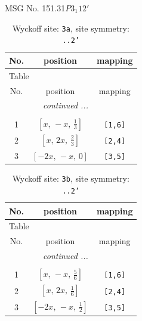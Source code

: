 \documentclass[fleqn,8pt]{jsarticle}
\begin{document}
\setcounter{MaxMatrixCols}{32}

\renewcommand{\tablename}{Table~}
\renewcommand{\figurename}{Figure~}
\begin{center}
\LARGE
MSG No. 151.31\quad$P3_{1}12'$
\end{center}
\renewcommand{\arraystretch}{1.2}
\begin{longtable}{ccc}
\caption{Wyckoff site: {\tt 3a}, site symmetry: {\tt ..2'}}
 \\
 \hline \hline
No. & position & mapping \\ \hline \endfirsthead

\multicolumn{2}{l}{\tablename\ \thetable{}} \\
 \hline \hline
No. & position & mapping \\ \hline \endhead

 \hline \hline
\multicolumn{2}{r}{\footnotesize\it continued ...} \\ \endfoot

 \hline \hline
\multicolumn{2}{r}{} \\ \endlastfoot

1 & $\left[ x,\, - x,\, \frac{1}{3} \right]$ & {\tt [1,6]} \\ \hline
2 & $\left[ x,\, 2 x,\, \frac{2}{3} \right]$ & {\tt [2,4]} \\ \hline
3 & $\left[ - 2 x,\, - x,\, 0 \right]$ & {\tt [3,5]} \\
\end{longtable}
\renewcommand{\arraystretch}{1.2}
\begin{longtable}{ccc}
\caption{Wyckoff site: {\tt 3b}, site symmetry: {\tt ..2'}}
 \\
 \hline \hline
No. & position & mapping \\ \hline \endfirsthead

\multicolumn{2}{l}{\tablename\ \thetable{}} \\
 \hline \hline
No. & position & mapping \\ \hline \endhead

 \hline \hline
\multicolumn{2}{r}{\footnotesize\it continued ...} \\ \endfoot

 \hline \hline
\multicolumn{2}{r}{} \\ \endlastfoot

1 & $\left[ x,\, - x,\, \frac{5}{6} \right]$ & {\tt [1,6]} \\ \hline
2 & $\left[ x,\, 2 x,\, \frac{1}{6} \right]$ & {\tt [2,4]} \\ \hline
3 & $\left[ - 2 x,\, - x,\, \frac{1}{2} \right]$ & {\tt [3,5]} \\
\end{longtable}
\end{document}
